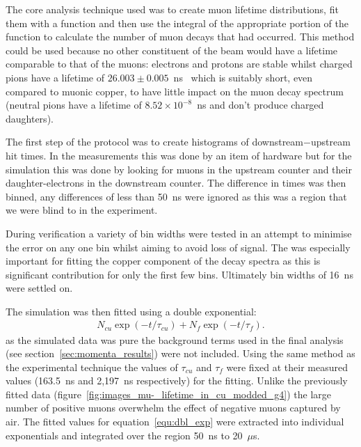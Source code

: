 
The core analysis technique used was to create muon lifetime distributions, fit them with a function and then use the integral of the appropriate portion of the function to calculate the number of muon decays that had occurred. This method could be used because no other constituent of the beam would have a lifetime comparable to that of the muons: electrons and protons are stable whilst charged pions have a lifetime of \(26.003\pm0.005\)~ns~\cite{pdg} which is suitably short, even compared to muonic copper, to have little impact on the muon decay spectrum (neutral pions have a lifetime of \( 8.52\times10^{-8}\)~ns and don't produce charged daughters).

The first step of the protocol was to create histograms of downstream\(-\)upstream hit times. In the measurements this was done by an item of hardware but for the simulation this was done by looking for muons in the upstream counter and their daughter-electrons in the downstream counter. The difference in times was then binned, any differences of less than 50~ns were ignored as this was a region that we were blind to in the experiment.

During verification a variety of bin widths were tested in an attempt to minimise the error on any one bin whilst aiming to avoid loss of signal. The was especially important for fitting the copper component of the decay spectra as this is significant contribution for only the first few bins. Ultimately bin widths of 16~ns were settled on.

The simulation was then fitted using a double exponential: 
\begin{align}
    N_{cu}\exp(-t/\tau_{cu}) + N_{f}\exp(-t/\tau_{f}). \label{equ:dbl_exp}
\end{align}
as the simulated data was pure the background terms used in the final analysis (see section~\ref{sec:momenta_results}) were not included. Using the same method as the experimental technique the values of \(\tau_{cu}\) and \(\tau_{f}\) were fixed at their measured values (163.5~ns and 2,197~ns respectively) for the fitting. Unlike the previously fitted data (figure~\ref{fig:images_mu-_lifetime_in_cu_modded_g4}) the large number of positive muons overwhelm the effect of negative muons captured by air. The fitted values for equation~\eqref{equ:dbl_exp} were extracted into individual exponentials and integrated over the region 50~ns to 20~\(\mu\)s. 

